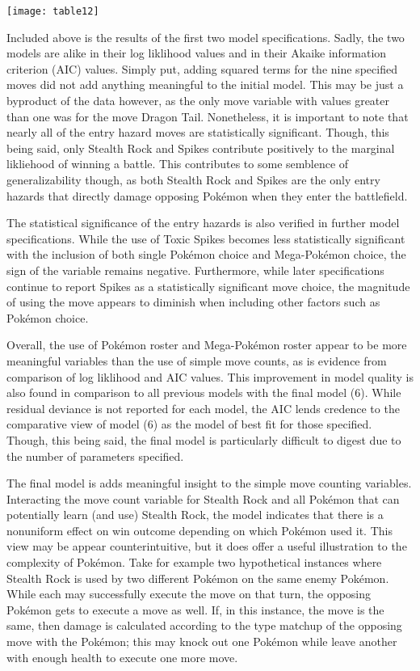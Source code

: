 \documentclass[12pt,twoside]{reedthesis}
\begin{document}
  \begin{center}\texttt{[image: table12]} \end{center}
  
  Included above is the results of the first two model specifications.
  Sadly, the two models are alike in their log liklihood values and in
  their Akaike information criterion (AIC) values. Simply put, adding
  squared terms for the nine specified moves did not add anything
  meaningful to the initial model. This may be just a byproduct of the
  data however, as the only move variable with values greater than one was
  for the move Dragon Tail. Nonetheless, it is important to note that
  nearly all of the entry hazard moves are statistically significant.
  Though, this being said, only Stealth Rock and Spikes contribute
  positively to the marginal likliehood of winning a battle. This
  contributes to some semblence of generalizability though, as both
  Stealth Rock and Spikes are the only entry hazards that directly damage
  opposing Pokémon when they enter the battlefield.
  
  The statistical significance of the entry hazards is also verified in
  further model specifications. While the use of Toxic Spikes becomes less
  statistically significant with the inclusion of both single Pokémon
  choice and Mega-Pokémon choice, the sign of the variable remains
  negative. Furthermore, while later specifications continue to report
  Spikes as a statistically significant move choice, the magnitude of
  using the move appears to diminish when including other factors such as
  Pokémon choice.
  
  Overall, the use of Pokémon roster and Mega-Pokémon roster appear to be
  more meaningful variables than the use of simple move counts, as is
  evidence from comparison of log liklihood and AIC values. This
  improvement in model quality is also found in comparison to all previous
  models with the final model (6). While residual deviance is not reported
  for each model, the AIC lends credence to the comparative view of model
  (6) as the model of best fit for those specified. Though, this being
  said, the final model is particularly difficult to digest due to the
  number of parameters specified.
  
  The final model is adds meaningful insight to the simple move counting
  variables. Interacting the move count variable for Stealth Rock and all
  Pokémon that can potentially learn (and use) Stealth Rock, the model
  indicates that there is a nonuniform effect on win outcome depending on
  which Pokémon used it. This view may be appear counterintuitive, but it
  does offer a useful illustration to the complexity of Pokémon. Take for
  example two hypothetical instances where Stealth Rock is used by two
  different Pokémon on the same enemy Pokémon. While each may successfully
  execute the move on that turn, the opposing Pokémon gets to execute a
  move as well. If, in this instance, the move is the same, then damage is
  calculated according to the type matchup of the opposing move with the
  Pokémon; this may knock out one Pokémon while leave another with enough
  health to execute one more move.
  
\end{document}
